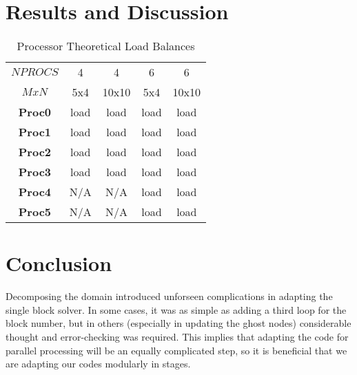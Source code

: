 \documentclass[twocolumn,10pt]{asme2ej}
\begin{document}
\section{Results and Discussion} \label{results}



\vspace{-1.8em}
\begin{table}[htb]
\begin{center}
\caption{Processor Theoretical Load Balances}
\begin{tabular}{|c | c c c c|}
\hline
\textbf{$NPROCS$} & 4   & 4   & 6     & 6     \\
\textbf{$MxN$}    & 5x4 & 10x10 & 5x4 & 10x10 \\
\hline
\textbf{Proc0}    & load & load & load & load \\
\textbf{Proc1}    & load & load & load & load \\
\textbf{Proc2}    & load & load & load & load \\
\textbf{Proc3}    & load & load & load & load \\
\textbf{Proc4}    & N/A & N/A & load & load \\
\textbf{Proc5}    & N/A & N/A & load & load \\

\hline
\end{tabular}
\label{lbtable}
\end{center}
\end{table}
\vspace{-2.3em}



\section{Conclusion}

Decomposing the domain introduced unforseen complications in adapting the single block solver.  In some cases, it was as simple as adding a third loop for the block number, but in others (especially in updating the ghost nodes) considerable thought and error-checking was required.  This implies that adapting the code for parallel processing will be an equally complicated step, so it is beneficial that we are adapting our codes modularly in stages.

\end{document}
